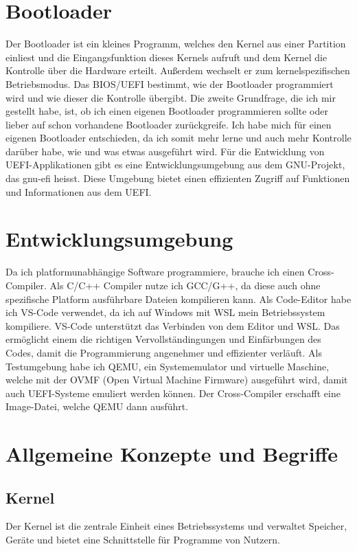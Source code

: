 \documentclass[12pt]{article}
\begin{document}
	\section{Bootloader}
	Der Bootloader ist ein kleines Programm, welches den Kernel aus einer Partition einliest und die Eingangsfunktion dieses Kernels aufruft und dem Kernel die Kontrolle über die Hardware erteilt. Außerdem wechselt er zum kernelspezifischen Betriebsmodus. Das BIOS/UEFI bestimmt, wie der Bootloader programmiert wird und wie dieser die Kontrolle übergibt.
	Die zweite Grundfrage, die ich mir gestellt habe, ist, ob ich einen eigenen Bootloader programmieren sollte oder lieber auf schon vorhandene Bootloader zurückgreife. Ich habe mich für einen eigenen Bootloader entschieden, da ich somit mehr lerne und auch mehr Kontrolle darüber habe, wie und was etwas ausgeführt wird. Für die Entwicklung von UEFI-Applikationen gibt es eine Entwicklungsumgebung aus dem GNU-Projekt, das gnu-efi heisst. Diese Umgebung bietet einen effizienten Zugriff auf Funktionen und Informationen aus dem UEFI.
	
	\section{Entwicklungsumgebung}
	Da ich platformunabhängige Software programmiere, brauche ich einen Cross-Compiler. Als C/C++ Compiler nutze ich GCC/G++, da diese auch ohne spezifische Platform ausführbare Dateien kompilieren kann. Als Code-Editor habe ich VS-Code verwendet, da ich auf Windows mit WSL mein Betriebssystem kompiliere. VS-Code unterstützt das Verbinden von dem Editor und WSL. Das ermöglicht einem die richtigen Vervollständingungen und Einfärbungen des Codes, damit die Programmierung angenehmer und effizienter verläuft. Als Testumgebung habe ich QEMU, ein Systememulator und virtuelle Maschine, welche mit der OVMF (Open Virtual Machine Firmware) ausgeführt wird, damit auch UEFI-Systeme emuliert werden können. Der Cross-Compiler erschafft eine Image-Datei, welche QEMU dann ausführt. 
	
	\newpage
	
	\section{Allgemeine Konzepte und Begriffe}
	\subsection{Kernel}
	Der Kernel ist die zentrale Einheit eines Betriebssystems und verwaltet Speicher, Geräte und bietet eine Schnittstelle für Programme von Nutzern. 
\end{document}
